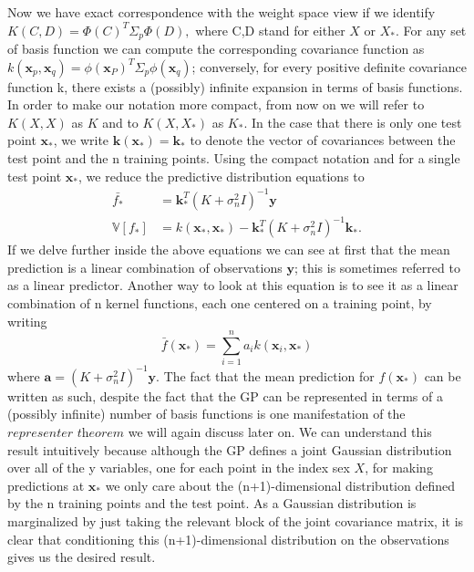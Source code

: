 \documentclass[12pt,a4paper,oneside]{book}
\theoremstyle{plain}
\theoremstyle{definition}
\begin{document}
{\vspace{2mm}
\noindent
Now we have exact correspondence with the weight space view if we identify $K(C,D)=\Phi(C)^T \Sigma_p \Phi(D),$ where C,D stand for either $X$ or $X_*$. For any set of basis function we can compute the corresponding covariance function as $k(\bm{x}_p,\bm{x}_q)=\phi(\bm{x}_P)^T\Sigma_p\phi(\bm{x}_q)$; conversely, for every positive definite covariance function k, there exists a (possibly) infinite expansion in terms of basis functions. 
\vspace{3mm}\newline
In order to make our notation more compact, from now on we will refer to $K(X,X)$ as $K$ and to $K(X,X_*)$ as $K_*$. In the case that there is only one test point $\bm{x}_*$, we write $\bm{k}(\bm{x}_*)=\bm{k}_*$ to denote the vector of covariances between the test point and the n training points. Using the compact notation and for a single test point $\bm{x}_*$, we reduce the predictive distribution equations to 
\begin{align*}
\bar{f_*}&=\bm{k}_*^T(K+\sigma_n^2I)^{-1}\bm{y} \\
\mathbb{V}[f_*]&=k(\bm{x}_*,\bm{x}_*)-\bm{k}_*^T(K+\sigma_n^2I)^{-1}\bm{k}_*.
\end{align*}
If we delve further inside the above equations we can see at first that the mean prediction is a linear combination of observations $\bm{y}$; this is sometimes referred to as a linear predictor. Another way to look at this equation is to see it as a linear combination of n kernel functions, each one centered on a training point, by writing $$\bar{f}(\bm{x}_*)=\sum_{i=1}^n a_i k(\bm{x}_i,\bm{x}_*)$$ where $\bm{a}=(K+\sigma_n^2I)^{-1}\bm{y}.$ The fact that the mean prediction for $f(\bm{x}_*)$ can be written as such, despite the fact that the GP can be represented in terms of a (possibly infinite) number of basis functions is one manifestation of the $\textit{representer theorem}$ we will again discuss later on. 
\vspace{3mm}\newline
We can understand this result intuitively because although the GP defines a joint Gaussian distribution over all of the y variables, one for each point in the index sex $X$, for making predictions at $\bm{x}_*$ we only care about the (n+1)-dimensional distribution defined by the n training points and the test point. As a Gaussian distribution is marginalized by just taking the relevant block of the joint covariance matrix, it is clear that conditioning this (n+1)-dimensional distribution on the observations gives us the desired result.  

}
\end{document}

